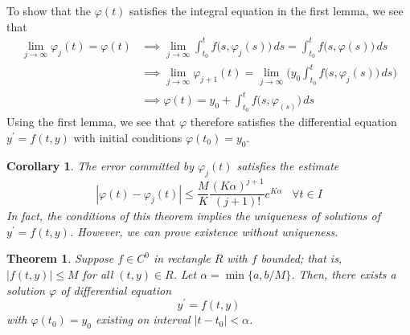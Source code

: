 \documentclass{article}
\newtheorem{theorem}{Theorem}[section]
\newtheorem{corollary}{Corollary}[theorem]
\theoremstyle{remark}
\theoremstyle{definition}
\begin{document}
To show that the $\varphi(t)$ satisfies the integral equation in the first lemma, we see that
\begin{align*}
    \lim_{j \rightarrow \infty} \varphi_j (t) = \varphi(t) & \implies \lim_{j \rightarrow \infty} \int_{t_0}^t f\big( s, \varphi_j (s)\big) \, ds = \int_{t_0}^t f\big(s, \varphi(s)\big) \,ds \\
    & \implies \lim_{j \rightarrow \infty} \varphi_{j+1} (t) = \lim_{j \rightarrow \infty} \bigg( y_0 \int_{t_0}^t f \big(s, \varphi_j (s)\big) \,ds\bigg) \\
    & \implies \varphi (t) = y_0 + \int_{t_0}^t f\big(s, \varphi_ (s) \big) \, ds 
\end{align*}
Using the first lemma, we see that $\varphi$ therefore satisfies the differential equation $y^\prime = f(t, y)$ with initial conditions $\varphi(t_0) = y_0$. 

\begin{corollary}
The error committed by $\varphi_j (t)$ satisfies the estimate 
\[|\varphi (t) - \varphi_j (t)| \leq \frac{M}{K} \frac{(K \alpha)^{j+1}}{(j+1)!} e^{K \alpha} \;\;\; \forall t \in I\]
In fact, the conditions of this theorem implies the uniqueness of solutions of $y^\prime = f(t, y)$. However, we can prove existence without uniqueness. 
\end{corollary}

\begin{theorem}
Suppose $f \in C^0$ in rectangle $R$ with $f$ bounded; that is, $|f(t, y)| \leq M$ for all $(t, y) \in R$. Let $\alpha = \min\{a, b /M\}$. Then, there exists a solution $\varphi$ of differential equation
\[y^\prime = f(t, y)\]
with $\varphi(t_0) = y_0$ existing on interval $|t - t_0| < \alpha$. 
\end{theorem}
\end{document}
